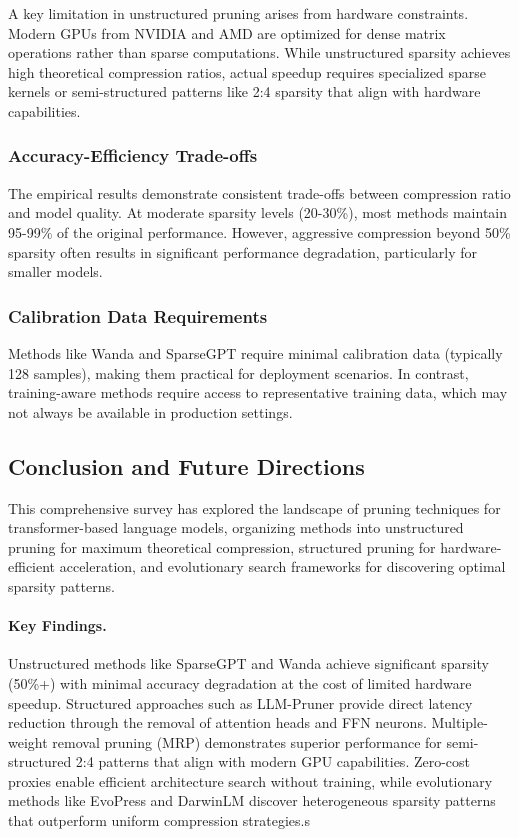 A key limitation in unstructured pruning arises from hardware constraints. Modern GPUs from NVIDIA and AMD are optimized for dense matrix operations rather than sparse computations. While unstructured sparsity achieves high theoretical compression ratios, actual speedup requires specialized sparse kernels or semi-structured patterns like 2:4 sparsity that align with hardware capabilities.

\subsubsection{Accuracy-Efficiency Trade-offs}

The empirical results demonstrate consistent trade-offs between compression ratio and model quality. At moderate sparsity levels (20-30\%), most methods maintain 95-99\% of the original performance. However, aggressive compression beyond 50\% sparsity often results in significant performance degradation, particularly for smaller models.

\subsubsection{Calibration Data Requirements}

Methods like Wanda and SparseGPT require minimal calibration data (typically 128 samples), making them practical for deployment scenarios. In contrast, training-aware methods require access to representative training data, which may not always be available in production settings.

\subsection{Conclusion and Future Directions}

This comprehensive survey has explored the landscape of pruning techniques for transformer-based language models, organizing methods into unstructured pruning for maximum theoretical compression, structured pruning for hardware-efficient acceleration, and evolutionary search frameworks for discovering optimal sparsity patterns.

\paragraph{Key Findings.}
Unstructured methods like SparseGPT and Wanda achieve significant sparsity (50\%+) with minimal accuracy degradation at the cost of limited hardware speedup. Structured approaches such as LLM-Pruner provide direct latency reduction through the removal of attention heads and FFN neurons. Multiple-weight removal pruning (MRP) demonstrates superior performance for semi-structured 2:4 patterns that align with modern GPU capabilities. Zero-cost proxies enable efficient architecture search without training, while evolutionary methods like EvoPress and DarwinLM discover heterogeneous sparsity patterns that outperform uniform compression strategies.s
